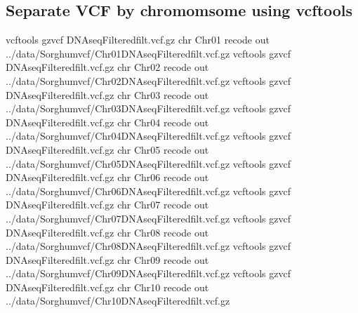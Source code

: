 \documentclass[letterpaper,10pt,english]{sphinxhowto}
\begin{document}
\subsection{Separate VCF by chromomsome using vcftools}
\label{\detokenize{VCFHunter:separate-vcf-by-chromomsome-using-vcftools}}
\begin{sphinxVerbatim}[commandchars=\\\{\}]
vcftools \PYGZhy{}\PYGZhy{}gzvcf DNAseq\PYGZus{}Filtered\PYGZus{}filt.vcf.gz \PYGZhy{}\PYGZhy{}chr Chr01 \PYGZhy{}\PYGZhy{}recode \PYGZhy{}\PYGZhy{}out ../data/Sorghumvcf/Chr01\PYGZus{}DNAseq\PYGZus{}Filtered\PYGZus{}filt.vcf.gz
vcftools \PYGZhy{}\PYGZhy{}gzvcf DNAseq\PYGZus{}Filtered\PYGZus{}filt.vcf.gz \PYGZhy{}\PYGZhy{}chr Chr02 \PYGZhy{}\PYGZhy{}recode \PYGZhy{}\PYGZhy{}out ../data/Sorghumvcf/Chr02\PYGZus{}DNAseq\PYGZus{}Filtered\PYGZus{}filt.vcf.gz
vcftools \PYGZhy{}\PYGZhy{}gzvcf DNAseq\PYGZus{}Filtered\PYGZus{}filt.vcf.gz \PYGZhy{}\PYGZhy{}chr Chr03 \PYGZhy{}\PYGZhy{}recode \PYGZhy{}\PYGZhy{}out ../data/Sorghumvcf/Chr03\PYGZus{}DNAseq\PYGZus{}Filtered\PYGZus{}filt.vcf.gz
vcftools \PYGZhy{}\PYGZhy{}gzvcf DNAseq\PYGZus{}Filtered\PYGZus{}filt.vcf.gz \PYGZhy{}\PYGZhy{}chr Chr04 \PYGZhy{}\PYGZhy{}recode \PYGZhy{}\PYGZhy{}out ../data/Sorghumvcf/Chr04\PYGZus{}DNAseq\PYGZus{}Filtered\PYGZus{}filt.vcf.gz
vcftools \PYGZhy{}\PYGZhy{}gzvcf DNAseq\PYGZus{}Filtered\PYGZus{}filt.vcf.gz \PYGZhy{}\PYGZhy{}chr Chr05 \PYGZhy{}\PYGZhy{}recode \PYGZhy{}\PYGZhy{}out ../data/Sorghumvcf/Chr05\PYGZus{}DNAseq\PYGZus{}Filtered\PYGZus{}filt.vcf.gz
vcftools \PYGZhy{}\PYGZhy{}gzvcf DNAseq\PYGZus{}Filtered\PYGZus{}filt.vcf.gz \PYGZhy{}\PYGZhy{}chr Chr06 \PYGZhy{}\PYGZhy{}recode \PYGZhy{}\PYGZhy{}out ../data/Sorghumvcf/Chr06\PYGZus{}DNAseq\PYGZus{}Filtered\PYGZus{}filt.vcf.gz
vcftools \PYGZhy{}\PYGZhy{}gzvcf DNAseq\PYGZus{}Filtered\PYGZus{}filt.vcf.gz \PYGZhy{}\PYGZhy{}chr Chr07 \PYGZhy{}\PYGZhy{}recode \PYGZhy{}\PYGZhy{}out ../data/Sorghumvcf/Chr07\PYGZus{}DNAseq\PYGZus{}Filtered\PYGZus{}filt.vcf.gz
vcftools \PYGZhy{}\PYGZhy{}gzvcf DNAseq\PYGZus{}Filtered\PYGZus{}filt.vcf.gz \PYGZhy{}\PYGZhy{}chr Chr08 \PYGZhy{}\PYGZhy{}recode \PYGZhy{}\PYGZhy{}out ../data/Sorghumvcf/Chr08\PYGZus{}DNAseq\PYGZus{}Filtered\PYGZus{}filt.vcf.gz
vcftools \PYGZhy{}\PYGZhy{}gzvcf DNAseq\PYGZus{}Filtered\PYGZus{}filt.vcf.gz \PYGZhy{}\PYGZhy{}chr Chr09 \PYGZhy{}\PYGZhy{}recode \PYGZhy{}\PYGZhy{}out ../data/Sorghumvcf/Chr09\PYGZus{}DNAseq\PYGZus{}Filtered\PYGZus{}filt.vcf.gz
vcftools \PYGZhy{}\PYGZhy{}gzvcf DNAseq\PYGZus{}Filtered\PYGZus{}filt.vcf.gz \PYGZhy{}\PYGZhy{}chr Chr10 \PYGZhy{}\PYGZhy{}recode \PYGZhy{}\PYGZhy{}out ../data/Sorghumvcf/Chr10\PYGZus{}DNAseq\PYGZus{}Filtered\PYGZus{}filt.vcf.gz
\end{sphinxVerbatim}
\end{document}
